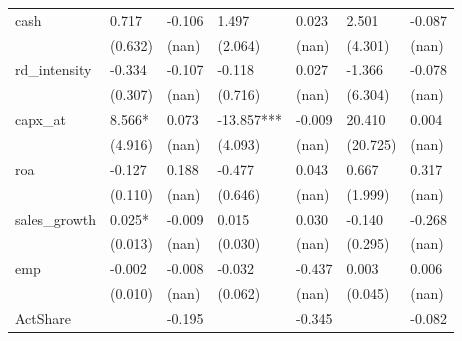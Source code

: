 \begin{table}
\begin{center}
\begin{tabular}{lllllll}
cash              & 0.717              & -0.106             & 1.497                & 0.023                & 2.501                & -0.087                         \\
                  & (0.632)            & (nan)              & (2.064)              & (nan)                & (4.301)              & (nan)                          \\
rd\_intensity     & -0.334             & -0.107             & -0.118               & 0.027                & -1.366               & -0.078                         \\
                  & (0.307)            & (nan)              & (0.716)              & (nan)                & (6.304)              & (nan)                          \\
capx\_at          & 8.566*             & 0.073              & -13.857***           & -0.009               & 20.410               & 0.004                          \\
                  & (4.916)            & (nan)              & (4.093)              & (nan)                & (20.725)             & (nan)                          \\
roa               & -0.127             & 0.188              & -0.477               & 0.043                & 0.667                & 0.317                          \\
                  & (0.110)            & (nan)              & (0.646)              & (nan)                & (1.999)              & (nan)                          \\
sales\_growth     & 0.025*             & -0.009             & 0.015                & 0.030                & -0.140               & -0.268                         \\
                  & (0.013)            & (nan)              & (0.030)              & (nan)                & (0.295)              & (nan)                          \\
emp               & -0.002             & -0.008             & -0.032               & -0.437               & 0.003                & 0.006                          \\
                  & (0.010)            & (nan)              & (0.062)              & (nan)                & (0.045)              & (nan)                          \\
ActShare          &                    & -0.195             &                      & -0.345               &                      & -0.082                         \\

\end{tabular}
\end{center}
\end{table}
